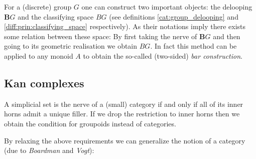     \begin{property}
        For a (discrete) group $G$ one can construct two important objects: the delooping $\mathbf{B}G$ and the classifying space $BG$ (see definitions \ref{cat:group_delooping} and \ref{diff:prin:classifying_space} respectively). As their notations imply there exists some relation between these space: By first taking the nerve of $\mathbf{B}G$ and then going to its geometric realisation we obtain $BG$. In fact this method can be applied to any monoid $A$ to obtain the so-called (two-sided) \textit{bar construction}.
    \end{property}

\subsection{Kan complexes}



    \begin{property}
        A simplicial set is the nerve of a (small) category if and only if all of its inner horns admit a unique filler. If we drop the restriction to inner horns then we obtain the condition for groupoids instead of categories.
    \end{property}

    By relaxing the above requirements we can generalize the notion of a category (due to \textit{Boardman} and \textit{Vogt}):
